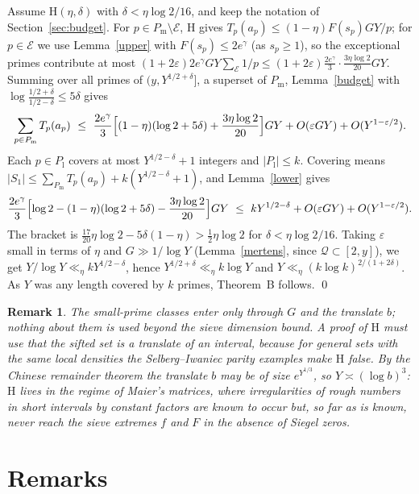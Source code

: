 \documentclass[11pt]{amsart}
\newtheorem{remark}[lemma]{Remark}
\newcommand{\eps}{\varepsilon}
\begin{document}
Assume $\mathrm H(\eta,\delta)$ with $\delta<\eta\log2/16$, and keep the notation of Section~\ref{sec:budget}. For $p\in P_{\mathrm m}\setminus\mathcal E$, $\mathrm H$ gives $T_p(a_p)\le(1-\eta)F(s_p)GY/p$; for $p\in\mathcal E$ we use Lemma~\ref{upper} with $F(s_p)\le2e^\gamma$ (as $s_p\ge1$), so the exceptional primes contribute at most $(1+2\eps)2e^{\gamma}GY\sum_{\mathcal E}1/p\le(1+2\eps)\frac{2e^{\gamma}}{3}\cdot\frac{3\eta\log2}{20}GY$. Summing over all primes of $(y,Y^{1/2+\delta}]$, a superset of $P_{\mathrm m}$, Lemma~\ref{budget} with $\log\frac{1/2+\delta}{1/2-\delta}\le5\delta$ gives
\[
\sum_{p\in P_{\mathrm m}}T_p(a_p)\ \le\ \frac{2e^{\gamma}}{3}\Bigl[(1-\eta)(\log2+5\delta)+\frac{3\eta\log2}{20}\Bigr]GY+O(\eps GY)+O(Y^{1-\eps/2}).
\]
Each $p\in P_{\mathrm l}$ covers at most $Y^{1/2-\delta}+1$ integers and $|P_{\mathrm l}|\le k$. Covering means $|S_1|\le\sum_{P_{\mathrm m}}T_p(a_p)+k(Y^{1/2-\delta}+1)$, and Lemma~\ref{lower} gives
\[
\frac{2e^{\gamma}}{3}\Bigl[\log2-(1-\eta)(\log2+5\delta)-\frac{3\eta\log2}{20}\Bigr]GY\ \le\ kY^{1/2-\delta}+O(\eps GY)+O(Y^{1-\eps/2}).
\]
The bracket is $\frac{17}{20}\eta\log2-5\delta(1-\eta)>\frac12\eta\log2$ for $\delta<\eta\log2/16$. Taking $\eps$ small in terms of $\eta$ and $G\gg1/\log Y$ (Lemma~\ref{mertens}, since $\mathcal Q\subset[2,y]$), we get $Y/\log Y\ll_\eta kY^{1/2-\delta}$, hence $Y^{1/2+\delta}\ll_\eta k\log Y$ and $Y\ll_\eta(k\log k)^{2/(1+2\delta)}$. As $Y$ was any length covered by $k$ primes, Theorem~B follows. \qed

\begin{remark}
The small-prime classes enter only through $G$ and the translate $b$; nothing about them is used beyond the sieve dimension bound. A proof of $\mathrm H$ must use that the sifted set is a translate of an interval, because for general sets with the same local densities the Selberg--Iwaniec parity examples make $\mathrm H$ false. By the Chinese remainder theorem the translate $b$ may be of size $e^{Y^{1/3}}$, so $Y\asymp(\log b)^3$: $\mathrm H$ lives in the regime of Maier's matrices, where irregularities of rough numbers in short intervals by constant factors are known to occur but, so far as is known, never reach the sieve extremes $f$ and $F$ in the absence of Siegel zeros.
\end{remark}

\section{Remarks}
\end{document}
